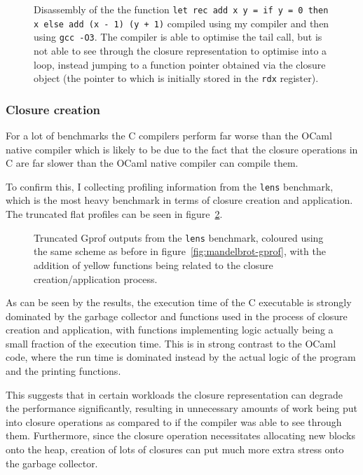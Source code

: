 \begin{figure}
    \centering
    
    \caption{Disassembly of the the function \texttt{let rec add x y = if y = 0 
    then x else add (x - 1) (y + 1)} compiled using my compiler and then using 
    \texttt{gcc -O3}. The compiler is able to optimise the tail call, but is 
    not able to see through the closure representation to optimise into a loop, 
    instead jumping to a function pointer obtained via the closure object (the 
    pointer to which is initially stored in the \texttt{rdx} register).}
    \label{fig:tail-recursion}
\end{figure}

\subsubsection{Closure creation}

For a lot of benchmarks the C compilers perform far worse than the OCaml native 
compiler which is likely to be due to the fact that the closure operations in C 
are far slower than the OCaml native compiler can compile them.

To confirm this, I collecting profiling information from the \texttt{lens}
benchmark, which is the most heavy benchmark in terms of closure creation and
application. The truncated flat profiles can be seen in
figure~\ref{fig:closure-creation}.

\begin{figure}
    \centering
    
    \caption{Truncated Gprof outputs from the \texttt{lens} benchmark, coloured 
    using the same scheme as before in figure~\ref{fig:mandelbrot-gprof}, with 
    the addition of yellow functions being related to the closure 
    creation/application process.}
    \label{fig:closure-creation}
\end{figure}

As can be seen by the results, the execution time of the C executable is 
strongly dominated by the garbage collector and functions used in the process 
of closure creation and application, with functions implementing logic actually 
being a small fraction of the execution time. This is in strong contrast to the 
OCaml code, where the run time is dominated instead by the actual logic of the 
program and the printing functions.

This suggests that in certain workloads the closure representation can degrade 
the performance significantly, resulting in unnecessary amounts of work being 
put into closure operations as compared to if the compiler was able to see 
through them. Furthermore, since the closure operation necessitates allocating 
new blocks onto the heap, creation of lots of closures can put much more extra 
stress onto the garbage collector.

